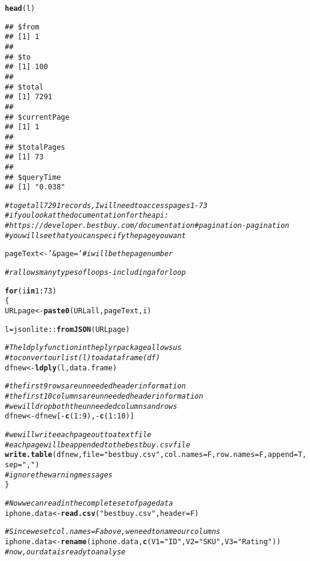 \documentclass{article}\usepackage[]{graphicx}\usepackage[]{color}
\makeatletter
\newcommand{\hlnum}[1]{\textcolor[rgb]{0.686,0.059,0.569}{#1}}%
\newcommand{\hlstr}[1]{\textcolor[rgb]{0.192,0.494,0.8}{#1}}%
\newcommand{\hlcom}[1]{\textcolor[rgb]{0.678,0.584,0.686}{\textit{#1}}}%
\newcommand{\hlopt}[1]{\textcolor[rgb]{0,0,0}{#1}}%
\newcommand{\hlstd}[1]{\textcolor[rgb]{0.345,0.345,0.345}{#1}}%
\newcommand{\hlkwa}[1]{\textcolor[rgb]{0.161,0.373,0.58}{\textbf{#1}}}%
\newcommand{\hlkwb}[1]{\textcolor[rgb]{0.69,0.353,0.396}{#1}}%
\newcommand{\hlkwc}[1]{\textcolor[rgb]{0.333,0.667,0.333}{#1}}%
\newcommand{\hlkwd}[1]{\textcolor[rgb]{0.737,0.353,0.396}{\textbf{#1}}}%
\newenvironment{kframe}{%
 \def\at@end@of@kframe{}%
 \ifinner\ifhmode%
  \def\at@end@of@kframe{\end{minipage}}%
  \begin{minipage}{\columnwidth}%
 \fi\fi%
 \def\FrameCommand##1{\hskip\@totalleftmargin \hskip-\fboxsep
 \colorbox{shadecolor}{##1}\hskip-\fboxsep
     \hskip-\linewidth \hskip-\@totalleftmargin \hskip\columnwidth}%
 \MakeFramed {\advance\hsize-\width
   \@totalleftmargin\z@ \linewidth\hsize
   \@setminipage}}%
 {\par\unskip\endMakeFramed%
 \at@end@of@kframe}
\newenvironment{knitrout}{}{} %
\makeatother
\begin{document}
\begin{knitrout}
\begin{kframe}
\begin{alltt}
\hlkwd{head}\hlstd{(l)}
\end{alltt}
\begin{verbatim}
## $from
## [1] 1
## 
## $to
## [1] 100
## 
## $total
## [1] 7291
## 
## $currentPage
## [1] 1
## 
## $totalPages
## [1] 73
## 
## $queryTime
## [1] "0.038"
\end{verbatim}
\begin{alltt}
\hlcom{# to get all 7291 records, I will need to access pages 1-73}
\hlcom{# if you look at the documentation for the api:}
\hlcom{# https://developer.bestbuy.com/documentation#pagination-pagination}
\hlcom{# you will see that you can specify the page you want}

\hlstd{pageText} \hlkwb{<-} \hlstr{'&page='} \hlcom{# i will be the page number}

\hlcom{# r allows many types of loops - including a for loop}

\hlkwa{for} \hlstd{(i} \hlkwa{in}  \hlnum{1}\hlopt{:}\hlnum{73}\hlstd{)}
\hlstd{\{}
  \hlstd{URLpage} \hlkwb{<-}\hlkwd{paste0}\hlstd{(URLall, pageText, i)}

  \hlstd{l} \hlkwb{=} \hlstd{jsonlite}\hlopt{::}\hlkwd{fromJSON}\hlstd{(URLpage)}

  \hlcom{# The ldply function in the plyr package allows us }
  \hlcom{#  to convert our list (l) to a dataframe (df)}
  \hlstd{dfnew} \hlkwb{<-} \hlkwd{ldply} \hlstd{(l, data.frame)}

  \hlcom{# the first 9 rows are unneeded header information}
  \hlcom{# the first 10 columns are unneeded header information}
  \hlcom{# we will drop both the unneeded columns and rows}
  \hlstd{dfnew}\hlkwb{<-}\hlstd{dfnew[}\hlopt{-}\hlkwd{c}\hlstd{(}\hlnum{1}\hlopt{:}\hlnum{9}\hlstd{),}\hlopt{-}\hlkwd{c}\hlstd{(}\hlnum{1}\hlopt{:}\hlnum{10}\hlstd{)]}

  \hlcom{# we will write each page out to a text file}
  \hlcom{# each page will be appended to the bestbuy.csv file}
  \hlkwd{write.table}\hlstd{(dfnew,} \hlkwc{file}\hlstd{=}\hlstr{"bestbuy.csv"}\hlstd{,} \hlkwc{col.names}\hlstd{=F,} \hlkwc{row.names}\hlstd{=F,} \hlkwc{append}\hlstd{=T,} \hlkwc{sep}\hlstd{=}\hlstr{","}\hlstd{)}
  \hlcom{# ignore the warning messages}
\hlstd{\}}
\end{alltt}


{\ttfamily\noindent\bfseries{}}\begin{alltt}
\hlcom{# Now we can read in the complete set of page data}
\hlstd{iphone.data} \hlkwb{<-}\hlkwd{read.csv}\hlstd{(}\hlstr{"bestbuy.csv"}\hlstd{,} \hlkwc{header} \hlstd{= F)}

\hlcom{# Since we set col.names=F above, we need to name our columns}
\hlstd{iphone.data}\hlkwb{<-}\hlkwd{rename}\hlstd{(iphone.data,}\hlkwd{c}\hlstd{(}\hlkwc{V1}\hlstd{=}\hlstr{"ID"}\hlstd{,} \hlkwc{V2}\hlstd{=}\hlstr{"SKU"}\hlstd{,} \hlkwc{V3} \hlstd{=} \hlstr{"Rating"}\hlstd{))}
\hlcom{# now, our data is ready to analyse}
\end{alltt}
\end{kframe}
\end{knitrout}
\end{document}
